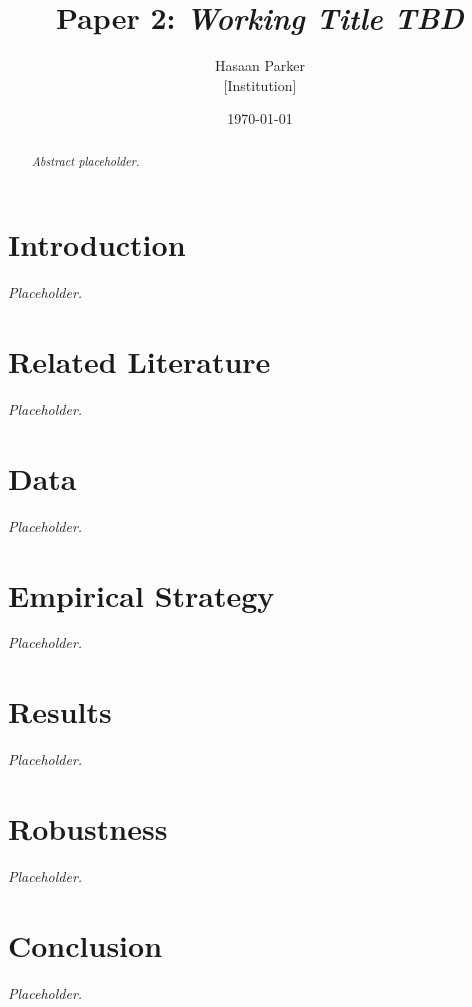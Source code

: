 \documentclass[12pt]{article}
\title{Paper 2: \textit{Working Title TBD}}
\author{Hasaan Parker \\ \small{[Institution]}}
\date{\today}
\begin{document}
\maketitle

\begin{abstract}
\noindent
\textit{Abstract placeholder.}
\end{abstract}

\section{Introduction}
\textit{Placeholder.}

\section{Related Literature}
\textit{Placeholder.}

\section{Data}
\textit{Placeholder.}

\section{Empirical Strategy}
\textit{Placeholder.}

\section{Results}
\textit{Placeholder.}

\section{Robustness}
\textit{Placeholder.}

\section{Conclusion}
\textit{Placeholder.}



\end{document}
